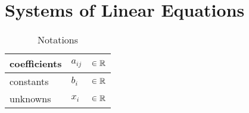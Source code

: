 \chapter{Systems of Linear Equations}




\begin{customArrayStretch}{1.3}
\begin{table}[H]
    \centering
    \begin{tabular}{| l | l  l |}
        \hline
        
        coefficients & $a_{ij}$    & $\in \mathbb{R}$ \\ \hline
        
        constants & $b_{i}$     & $\in \mathbb{R}$ \\ \hline

        unknowns & $x_{i}$     & $\in \mathbb{R}$ \\ \hline

    \end{tabular}
    \caption*{Notations}
\end{table}
\end{customArrayStretch}


\vspace{0.5cm}


